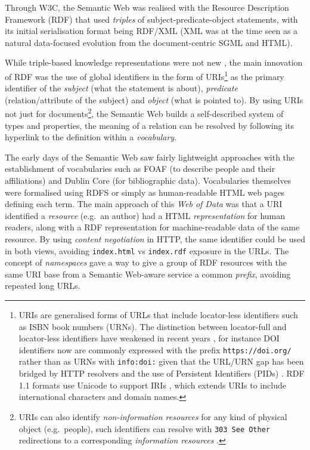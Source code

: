\documentclass[fleqn,10pt,lineno]{wlpeerjlua}
\begin{document}
Through W3C, the Semantic Web was realised with the Resource Description Framework (RDF) \autocite{w3-rdf11-primer} that used \emph{triples} of subject-predicate-object statements, with its initial serialisation format \autocite{w3-rdf-syntax} being RDF/XML (XML was at the time seen as a natural data-focused evolution from the document-centric SGML and HTML).

While triple-based knowledge representations were not new \autocite{stanczykProcessModellingInformation1987}, the main innovation of RDF was the use of global identifiers in the form of URIs\footnote{URIs \autocite{rfc3986} are generalised forms of URLs that include locator-less identifiers such as ISBN book numbers (URNs). The distinction between locator-full and locator-less identifiers have weakened in recent years \autocite{InfoURIRegistry}, for instance DOI identifiers now are commonly expressed with the prefix \texttt{https://doi.org/} rather than as URNs with \texttt{info:doi:} given that the URL/URN gap has been bridged by HTTP resolvers and the use of Persistent Identifiers (PIDs) \autocite{jutyIdentifiersOrgMIRIAM2011}. RDF 1.1 formats use Unicode to support IRIs \autocite{rfc3987}, which extends URIs to include international characters and domain names.} as the primary identifier of the \emph{subject} (what the statement is about), \emph{predicate} (relation/attribute of the subject) and \emph{object} (what is pointed to). By using URIs not just for documents\footnote{URIs can also identify \emph{non-information resources} for any kind of physical object (e.g.~people), such identifiers can resolve with \texttt{303\ See\ Other} redirections to a corresponding \emph{information resources} \autocite{sauermannCoolURIsSemantic2011}.}, the Semantic Web builds a self-described system of types and properties, the meaning of a relation can be resolved by following its hyperlink to the definition within a \emph{vocabulary}.

The early days of the Semantic Web saw fairly lightweight approaches with the establishment of vocabularies such as FOAF (to describe people and their affiliations) and Dublin Core (for bibliographic data). Vocabularies themselves were formalised using RDFS or simply as human-readable HTML web pages defining each term. The main approach of this \emph{Web of Data} was that a URI identified a \emph{resource} (e.g.~an author) had a HTML \emph{representation} for human readers, along with a RDF representation for machine-readable data of the same resource. By using \emph{content negotiation} in HTTP, the same identifier could be used in both views, avoiding \texttt{index.html} vs \texttt{index.rdf} exposure in the URLs. The concept of \emph{namespaces} gave a way to give a group of RDF resources with the same URI base from a Semantic Web-aware service a common \emph{prefix}, avoiding repeated long URLs.
\end{document}
